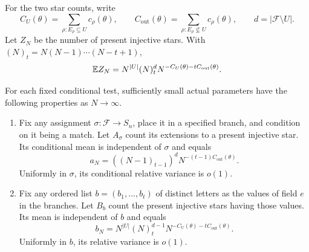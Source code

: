 For the two star counts, write
\[
C_U(\theta)=\sum_{\rho:E_\rho\subseteq U}c_\rho(\theta),
\qquad
C_{\mathrm{out}}(\theta)
 =\sum_{\rho:E_\rho\not\subseteq U}c_\rho(\theta),
\qquad d=|\mathcal F\setminus U|.
\]
Let $Z_N$ be the number of present injective stars.  With
$(N)_t=N(N-1)\cdots(N-t+1)$,
\begin{equation}\label{sample:eq-star-mean}
\mathbb E Z_N
 =N^{|U|}(N)_t^d
  N^{-C_U(\theta)-tC_{\mathrm{out}}(\theta)}.
\end{equation}

\begin{lemma}\label{sample:lem-conditional-counts}
For each fixed conditional test, sufficiently small actual parameters
have the following properties as $N\to\infty$.
\begin{enumerate}
\item Fix any assignment $\sigma:\mathcal F\to S_n$, place it in a
specified branch, and condition on it being a match.  Let $A_\sigma$
count its extensions to a present injective star.  Its conditional
mean is independent of $\sigma$ and equals
\begin{equation}\label{sample:eq-extension-mean}
a_N=((N-1)_{t-1})^d
       N^{-(t-1)C_{\mathrm{out}}(\theta)}.
\end{equation}
Uniformly in $\sigma$, its conditional relative variance is $o(1)$.
\item Fix any ordered list $b=(b_1,\ldots,b_t)$ of distinct letters
as the values of field $e$ in the branches.  Let $B_b$ count the present
injective stars having those values.  Its mean is independent of $b$
and equals
\begin{equation}\label{sample:eq-leaf-mean}
b_N=N^{|U|}(N)_t^{d-1}
       N^{-C_U(\theta)-tC_{\mathrm{out}}(\theta)}.
\end{equation}
Uniformly in $b$, its relative variance is $o(1)$.
\end{enumerate}
\end{lemma}
